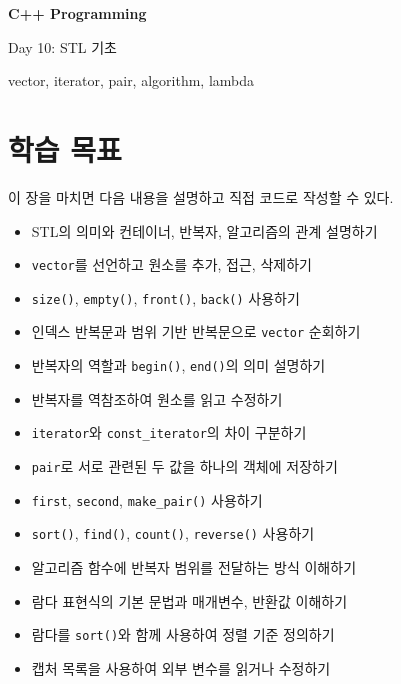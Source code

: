 \documentclass[11pt,a4paper]{article}
\begin{document}
\begin{titlepage}
    \centering
    \vspace*{3cm}
    {\Huge\bfseries C++ Programming\par}
    \vspace{0.8cm}
    {\LARGE Day 10: STL 기초\par}
    \vspace{2cm}
    {\large vector, iterator, pair, algorithm, lambda\par}
    \vfill
\end{titlepage}

\tableofcontents
\newpage

\section{학습 목표}
\begin{learningbox}
이 장을 마치면 다음 내용을 설명하고 직접 코드로 작성할 수 있다.
\begin{itemize}[leftmargin=1.5em]
    \item STL의 의미와 컨테이너, 반복자, 알고리즘의 관계 설명하기
    \item \texttt{vector}를 선언하고 원소를 추가, 접근, 삭제하기
    \item \texttt{size()}, \texttt{empty()}, \texttt{front()}, \texttt{back()} 사용하기
    \item 인덱스 반복문과 범위 기반 반복문으로 \texttt{vector} 순회하기
    \item 반복자의 역할과 \texttt{begin()}, \texttt{end()}의 의미 설명하기
    \item 반복자를 역참조하여 원소를 읽고 수정하기
    \item \texttt{iterator}와 \texttt{const\_iterator}의 차이 구분하기
    \item \texttt{pair}로 서로 관련된 두 값을 하나의 객체에 저장하기
    \item \texttt{first}, \texttt{second}, \texttt{make\_pair()} 사용하기
    \item \texttt{sort()}, \texttt{find()}, \texttt{count()}, \texttt{reverse()} 사용하기
    \item 알고리즘 함수에 반복자 범위를 전달하는 방식 이해하기
    \item 람다 표현식의 기본 문법과 매개변수, 반환값 이해하기
    \item 람다를 \texttt{sort()}와 함께 사용하여 정렬 기준 정의하기
    \item 캡처 목록을 사용하여 외부 변수를 읽거나 수정하기
\end{itemize}
\end{learningbox}
\end{document}
